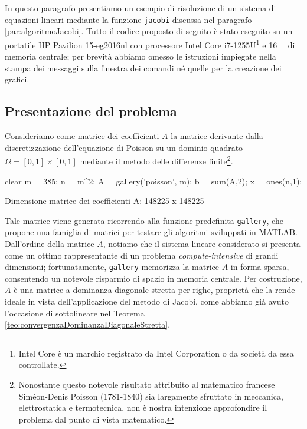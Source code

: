 In questo paragrafo presentiamo un esempio di risoluzione di un sistema di equazioni lineari mediante la funzione
\lstinline{jacobi} discussa nel paragrafo \ref{par:algoritmoJacobi}. \newline
Tutto il codice proposto di seguito \`e stato eseguito su un portatile HP Pavilion 15-eg2016nl con processore Intel\textsuperscript{\textregistered} Core\textsuperscript{\texttrademark} i7-1255U\footnote{Intel Core \`e un marchio registrato da Intel Corporation o da societ\`a da essa controllate.} e \qty{16}{\giga\byte} di memoria centrale; per brevit\`a abbiamo omesso le istruzioni impiegate nella stampa dei messaggi sulla finestra dei comandi n\'e quelle per la creazione dei grafici.
\subsection{Presentazione del problema}
Consideriamo come matrice dei coefficienti $A$ la matrice derivante dalla discretizzazione dell'equazione di Poisson su un
dominio quadrato $\Omega=[0, 1]\times[0, 1]$ mediante il metodo delle differenze finite\footnote{
    Nonostante questo notevole risultato attribuito al matematico francese Sim\'eon-Denis Poisson (1781-1840) sia largamente sfruttato in meccanica,
    elettrostatica e termotecnica, non \`e nostra intenzione approfondire il problema dal punto di vista matematico.}.
\begin{matlabcode}
    clear
    m = 385;
    n = m^2;
    A = gallery('poisson', m);
    b = sum(A,2);
    x = ones(n,1);
\end{matlabcode}
\begin{matlaboutput}
    Dimensione matrice dei coefficienti A: 148225 x 148225
\end{matlaboutput}
Tale matrice viene generata ricorrendo alla funzione predefinita \lstinline{gallery}, che propone una famiglia di matrici per testare gli algoritmi sviluppati in MATLAB.\newline
Dall'ordine della matrice $A$, notiamo che il sistema lineare considerato si presenta come un ottimo rappresentante
di un problema \textit{compute-intensive} di grandi dimensioni; fortunatamente, \lstinline{gallery} memorizza la matrice $A$ in
forma sparsa, consentendo un notevole risparmio di spazio in memoria centrale.\newline
Per costruzione, $A$ \`e una matrice a dominanza diagonale stretta per righe, propriet\`a che la rende ideale
in vista dell'applicazione del metodo di Jacobi, come abbiamo gi\`a avuto l'occasione di sottolineare nel Teorema
\ref{teo:convergenzaDominanzaDiagonaleStretta}.

